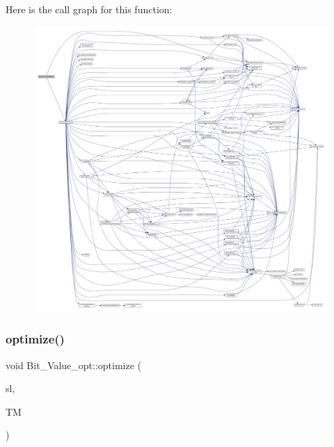 Here is the call graph for this function\+:
\nopagebreak
\begin{figure}[H]
\begin{center}
\leavevmode
\includegraphics[width=350pt]{dc/d5b/classBit__Value__opt_a54603f3942c41184e00ac94da081d044_cgraph}
\end{center}
\end{figure}
\mbox{\label{classBit__Value__opt_a82c083d2a6a103f4dff51656736635ae}} 
\subsubsection{\texorpdfstring{optimize()}{optimize()}}
{\footnotesize\ttfamily void Bit\+\_\+\+Value\+\_\+opt\+::optimize (\begin{DoxyParamCaption}\item[{\hyperlink{structstatement__list}{statement\+\_\+list} $\ast$}]{sl,  }\item[{\hyperlink{tree__manager_8hpp_a96ff150c071ce11a9a7a1e40590f205e}{tree\+\_\+manager\+Ref}}]{TM }\end{DoxyParamCaption})\hspace{0.3cm}{\ttfamily [private]}}



